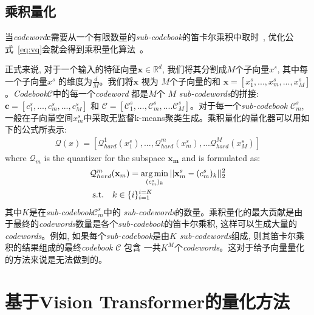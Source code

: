 \subsection{乘积量化}
当\textit{codeword}$\mathbf{c}$需要从一个有限数量的\textit{sub-codebook}的笛卡尔乘积中取时~\cite{ge2013optimized}, 优化公式~\ref{eq:vq}会就会得到乘积量化算法~\cite{jegou2010product}。\par
正式来说, 对于一个输入的特征向量$\mathbf{x} \in \mathbb{R}^d$, 我们将其分割成$M$个子向量$x^s$, 其中每一个子向量$x^s$ 的维度为$\frac{d}{M}$。我们将$\mathbf{x}$ 视为 $M$个子向量的和 $\mathbf{x} = [x^s_1,...,x^s_m,...,x^s_M]$。\textit{Codebook}$\mathcal{C}$中的每一个\textit{codeword} 都是$M$个 $M$ \textit{sub-codewords}的拼接: $\mathbf{c} = [c^s_1,...,c^s_m,...,c^s_M]$ 和  $\mathcal{C} = [\mathcal{C}^s_1,...,\mathcal{C}^s_m,....\mathcal{C}^s_M ]$。对于每一个\textit{sub-codebook} $\mathcal{C}^s_m$, 一般在子向量空间$x^s_m$中采取无监督k-means聚类生成。乘积量化的量化器可以用如下的公式所表示:
\begin{equation}
    \begin{aligned}
    \mathcal{Q}(x) = [\mathcal{Q}^1_{hard}(x^s_1),...,\mathcal{Q}^m_{hard}(x^s_m),...\mathcal{Q}^M_{hard}(x^s_M)]
    \end{aligned}
    \end{equation}
    where $\mathcal{Q}_m$ is the quantizer for the subspace $\mathbf{x_m}$ and is formulated as:
    \begin{equation}
    \label{eq:pq1}
    \begin{aligned}
    &\mathcal{Q}^m_{hard}(\mathbf{x}_m) = \operatorname*{arg\,min}_{(c^s_m)_k} ||\mathbf{x}_m^s - (c^s_m)_k ||^2_2  \\
    &\text { s.t.}  \quad k \in  \{i\}_{i=1}^{i=K}
    \end{aligned}
    \end{equation}
其中$K$是在\textit{sub-codebook}$\mathcal{C}_m^s$中的 \textit{sub-codewords}的数量。乘积量化的最大贡献是由于最终的\textit{codewords}数量是各个\textit{sub-codebook}的笛卡尔乘积, 这样可以生成大量的\textit{codewords}。例如, 如果每个\textit{sub-codebook}是由$K$ \textit{sub-codewords}组成, 则其笛卡尔乘积的结果组成的最终\textit{codebook} $\mathcal{C}$ 包含 一共$K^M$个\textit{codewords}。这对于给予向量量化的方法来说是无法做到的。
\section{基于Vision Transformer的量化方法}
